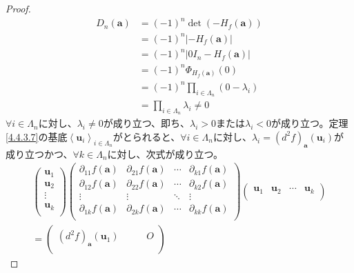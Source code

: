 \documentclass[dvipdfmx]{jsarticle}
\begin{document}
\begin{proof}
\begin{align*}
D_{n}\left( \mathbf{a} \right) &= ( - 1)^{n}\det\left( - H_{f}\left( \mathbf{a} \right) \right)\\
&= ( - 1)^{n}\left| - H_{f}\left( \mathbf{a} \right) \right|\\
&= ( - 1)^{n}\left| 0I_{n} - H_{f}\left( \mathbf{a} \right) \right|\\
&= ( - 1)^{n}\varPhi_{H_{f}\left( \mathbf{a} \right)}(0)\\
&= ( - 1)^{n}\prod_{i \in \varLambda_{n}} \left( 0 - \lambda_{i} \right)\\
&= \prod_{i \in \varLambda_{n}} \lambda_{i} \neq 0
\end{align*}
$\forall i \in \varLambda_{n}$に対し、$\lambda_{i} \neq 0$が成り立つ、即ち、$\lambda_{i} > 0$または$\lambda_{i} < 0$が成り立つ。定理\ref{4.4.3.7}の基底$\left\langle \mathbf{u}_{i} \right\rangle_{i \in \varLambda_{n}}$がとられると、$\forall i \in \varLambda_{n}$に対し、$\lambda_{i} = \left( d^{2}f \right)_{\mathbf{a}}\left( \mathbf{u}_{i} \right)$が成り立つかつ、$\forall k \in \varLambda_{n}$に対し、次式が成り立つ。
\begin{align*}
\begin{pmatrix}
\mathbf{u}_{1} \\
\mathbf{u}_{2} \\
 \vdots \\
\mathbf{u}_{k} \\
\end{pmatrix}\begin{pmatrix}
\partial_{11}f\left( \mathbf{a} \right) & \partial_{21}f\left( \mathbf{a} \right) & \cdots & \partial_{k1}f\left( \mathbf{a} \right) \\
\partial_{12}f\left( \mathbf{a} \right) & \partial_{22}f\left( \mathbf{a} \right) & \cdots & \partial_{k2}f\left( \mathbf{a} \right) \\
 \vdots & \vdots & \ddots & \vdots \\
\partial_{1k}f\left( \mathbf{a} \right) & \partial_{2k}f\left( \mathbf{a} \right) & \cdots & \partial_{kk}f\left( \mathbf{a} \right) \\
\end{pmatrix}\begin{pmatrix}
\mathbf{u}_{1} & \mathbf{u}_{2} & \cdots & \mathbf{u}_{k} \\
\end{pmatrix} \\
= \begin{pmatrix}
\left( d^{2}f \right)_{\mathbf{a}}\left( \mathbf{u}_{1} \right) & \  & \  & O \\

\end{pmatrix}
\end{align*}
\end{proof}
\end{document}
